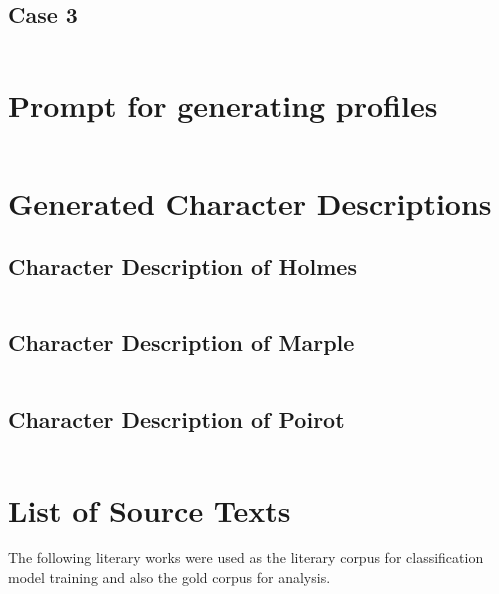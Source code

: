 \documentclass{article}
\begin{document}
\begin{appendices}
\subsection{Case 3} \label{sec:app_case3}
    \inputminted{yaml}{../cases/case3.yaml}

\section{Prompt for generating profiles} \label{sec:app_gen_profile}
    \inputminted{yaml}{../prompts/profile_prompts.yaml}

\section{Generated Character Descriptions} \label{sec:app_char_dcp}

\subsection{Character Description of Holmes} \label{sec:app_dcp_holmes}
    \inputminted{text}{../profiles/sherlock_holmes_analysis.txt}
\subsection{Character Description of Marple} \label{sec:app_dcp_marple}
    \inputminted{text}{../profiles/miss_marple_analysis.txt}
\subsection{Character Description of Poirot} \label{sec:app_dcp_poirot}
    \inputminted{text}{../profiles/hercule_poirot_analysis.txt}


\section{List of Source Texts} \label{sec:app_novels}
The following literary works were used as the literary corpus for classification model training and also the gold corpus for analysis.

\small
\vspace{0.5em}


\end{appendices}
\end{document}
